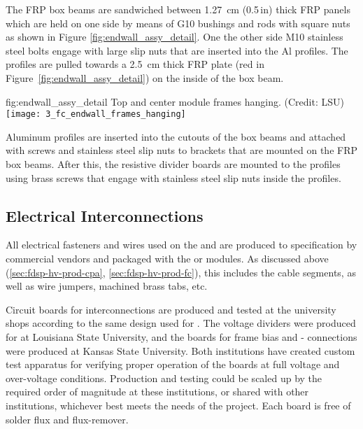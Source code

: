 The FRP box beams are sandwiched between \SI{1.27}{\cm} (\num{0.5}\,in) thick FRP panels which are held on one side by means of G10 bushings and rods with square nuts
as shown in Figure \ref{fig:endwall_assy_detail}. One the other side M10 stainless steel bolts engage with large slip nuts that are inserted into the Al profiles. The profiles 
are pulled towards a \SI{2.5}{\cm} thick FRP plate (red in Figure~\ref{fig:endwall_assy_detail}) on the inside of the box beam.
%

\begin{dunefigure}{fig:endwall_assy_detail}{%
Top and center  module frames hanging. (Credit: LSU)}
\texttt{[image: 3\_fc\_endwall\_frames\_hanging]}
\end{dunefigure}


Aluminum profiles are inserted into the cutouts of the box beams and attached with screws and stainless steel slip nuts to brackets that are mounted on the 
FRP box beams. After this, the resistive divider boards are mounted to the profiles using brass screws that engage with stainless steel slip nuts inside 
the profiles.

\subsection{Electrical Interconnections}
\label{sec:fdsp-hv-prod-interconnect}

All electrical fasteners and wires used on the  and  are produced
to specification by commercial vendors and packaged with the  or  modules.  
As discussed above (\ref{sec:fdsp-hv-prod-cpa}, \ref{sec:fdsp-hv-prod-fc}), 
this includes the  cable segments, as well as wire jumpers, machined brass
tabs, etc.

Circuit boards for %
 interconnections are produced and tested at the  university shops according to the same design used for .  The  voltage dividers were produced for  at Louisiana State University, and the boards for  frame bias and - connections were produced at Kansas State University.
Both institutions have created custom test apparatus for verifying proper operation of the boards at full voltage and over-voltage conditions.  Production and testing could be scaled up by the required order of magnitude at these institutions, or shared with other institutions, whichever best meets the needs of the project. Each board is free of solder flux and flux-remover. 
 
